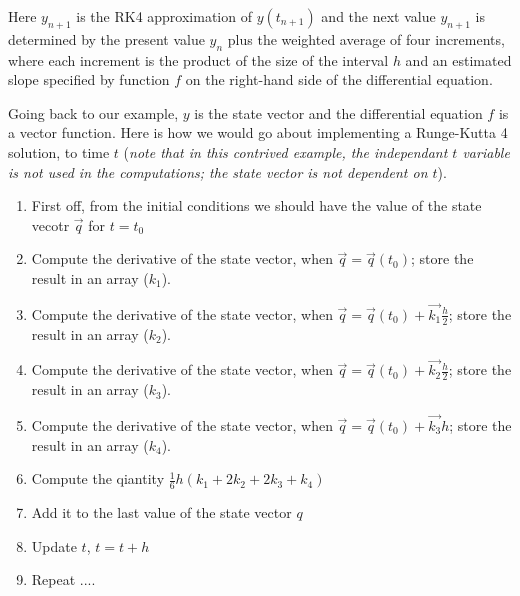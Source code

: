 \documentclass[12pt,a4paper,twoside]{report}
\begin{document}
Here \( y_{n+1} \) is the RK4 approximation of \( y( t_{n+1} ) \) and the next value 
\( y_{n+1} \) is determined by the present value \( y_n \) plus the weighted average 
of four increments, where each increment is the product of the size of the interval 
\(h\) and an estimated slope specified by function \(f\) on the right-hand side 
of the differential equation.

Going back to our example, \( y \) is the state vector and the differential equation 
\( f \) is a vector function. Here is how we would go about implementing a 
Runge-Kutta 4 solution, to time \( t \) (\textit{note that in this contrived example, 
the independant \( t \) variable is not used in the computations; the state vector 
is not dependent on \(t\)}).
\begin{enumerate}
  \item First off, from the initial conditions we should have the value of the state vecotr \( \vec{q} \) for \( t = t_0 \)
  \item Compute the derivative of the state vector, when \( \vec{q} = \vec{q}(t_0) \); 
  store the result in an array (\( k_1 \)).
  \item Compute the derivative of the state vector, when \( \vec{q} = \vec{q}(t_0)+\vec{k_1} \frac{h}{2} \); store the result in an array (\( k_2 \)).
  \item Compute the derivative of the state vector, when \( \vec{q} = \vec{q}(t_0)+\vec{k_2} \frac{h}{2} \); store the result in an array (\( k_3 \)).
  \item Compute the derivative of the state vector, when \( \vec{q} = \vec{q}(t_0)+\vec{k_3} h \); store the result in an array (\( k_4 \)).
  \item Compute the qiantity \( \frac{1}{6} h (k_1 + 2 k_2 + 2 k_3 + k_4) \)
  \item Add it to the last value of the state vector \( q \)
  \item Update \( t \), \( t = t + h \)
  \item Repeat  ....
\end{enumerate}




\end{document}
